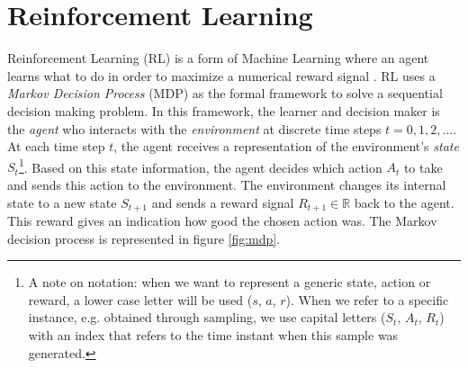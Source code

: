 \section{Reinforcement Learning}
\label{sec:intro_rl}
Reinforcement Learning (RL) is a form of Machine Learning where an agent learns what to do in order to maximize a numerical reward signal \cite{sutton2018reinforcement}. RL uses a \emph{Markov Decision Process} (MDP) as the formal framework to solve a sequential decision making problem. In this framework, the learner and decision maker is the \emph{agent} who interacts with the \emph{environment} at discrete time steps $t=0, 1, 2, \ldots$. At each time step $t$, the agent receives a representation of the environment's \emph{state} $S_t$\footnote{A note on notation: when we want to represent a generic state, action or reward, a lower case letter will be used ($s$, $a$, $r$). When we refer to a specific instance, e.g. obtained through sampling, we use capital letters ($S_t$, $A_t$, $R_t$) with an index that refers to the time instant when this sample was generated.}. Based on this state information, the agent decides which action $A_t$ to take and sends this action to the environment. The environment changes its internal state to a new state $S_{t+1}$ and sends a reward signal $R_{t+1} \in \mathbb{R}$ back to the agent. This reward gives an indication how good the chosen action was. The Markov decision process is represented in figure \ref{fig:mdp}.\\


